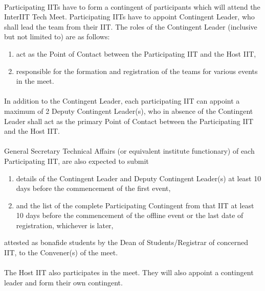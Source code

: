 \paragraph{}
Participating IITs have to form a contingent of participants which will attend the InterIIT Tech Meet. Participating IITs have to appoint Contingent Leader, who shall lead the team from their IIT. The roles of the Contingent Leader (inclusive but not limited to) are as follows:
\begin{enumerate}
    \item act as the Point of Contact between the Participating IIT and the Host IIT,
    \item responsible for the formation and registration of the teams for various events in the meet.
\end{enumerate}

\paragraph{}
In addition to the Contingent Leader, each participating IIT can appoint a maximum of 2 Deputy Contingent Leader(s), who in absence of the Contingent Leader shall act as the primary Point of Contact between the Participating IIT and the Host IIT.

\paragraph{}
General Secretary Technical Affairs (or equivalent institute functionary) of each Participating IIT, are also expected to submit
\begin{enumerate}
    \item details of the Contingent Leader and Deputy Contingent Leader(s) at least 10 days before the commencement of the first event,
    \item and the list of the complete Participating Contingent from that IIT at least 10 days before the commencement of the offline event or the last date of registration, whichever is later,
\end{enumerate}
attested as bonafide students by the Dean of Students/Registrar of concerned IIT, to the Convener(s) of the meet.

\paragraph{}
The Host IIT also participates in the meet. They will also appoint a contingent leader and form their own contingent.